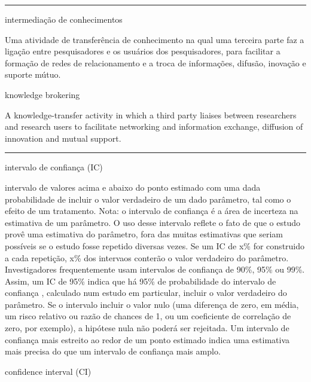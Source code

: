 \documentclass[
  openany]{book}
\begin{document}
\begin{center}\rule{0.5\linewidth}{0.5pt}\end{center}

intermediação de conhecimentos

Uma atividade de transferência de conhecimento na qual uma terceira parte faz a ligação entre pesquisadores e os usuários dos pesquisadores, para facilitar a formação de redes de relacionamento e a troca de informações, difusão, inovação e suporte mútuo.

knowledge brokering

A knowledge-transfer activity in which a third party liaises between researchers and research users to facilitate networking and information exchange, diffusion of innovation and mutual support.

\begin{center}\rule{0.5\linewidth}{0.5pt}\end{center}

intervalo de confiança (IC)

intervalo de valores acima e abaixo do ponto estimado com uma dada probabilidade de incluir o valor verdadeiro de um dado parâmetro, tal como o efeito de um tratamento. Nota: o intervalo de confiança é a área de incerteza na estimativa de um parâmetro. O uso desse intervalo reflete o fato de que o estudo provê uma estimativa do parâmetro, fora das muitas estimativas que seriam possíveis se o estudo fosse repetido diversas vezes. Se um IC de x\% for construido a cada repetição, x\% dos intervaos conterão o valor verdadeiro do parâmetro. Investigadores frequentemente usam intervalos de confiança de 90\%, 95\% ou 99\%. Assim, um IC de 95\% indica que há 95\% de probabilidade do intervalo de confiança , calculado num estudo em particular, incluir o valor verdadeiro do parâmetro. Se o intervalo incluir o valor nulo (uma diferença de zero, em média, um risco relativo ou razão de chances de 1, ou um coeficiente de correlação de zero, por exemplo), a hipótese nula não poderá ser rejeitada. Um intervalo de confiança mais estreito ao redor de um ponto estimado indica uma estimativa mais precisa do que um intervalo de confiança mais amplo.

confidence interval (CI)
\end{document}
